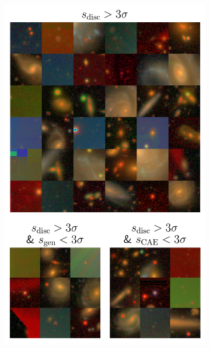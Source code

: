 \begin{figure}
\begin{subfigure}{0.33\textwidth}
  \includegraphics[width=0.95\linewidth]{score_effect_disc_ae.png}
  \caption{}
  \label{fig:score_effect_disc}
\end{subfigure}
\begin{subfigure}{0.33\textwidth}
  \centering

\end{subfigure}
\end{figure}

